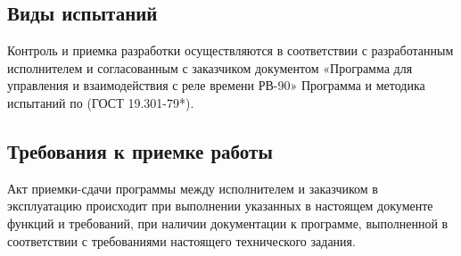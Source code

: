 \subsection{Виды испытаний}
Контроль и приемка разработки осуществляются в соответствии с разработанным исполнителем и согласованным с заказчиком документом «Программа для управления и взаимодействия с реле времени РВ-90» Программа и методика испытаний по (ГОСТ 19.301-79*).

\subsection{Требования к приемке работы}
Акт приемки-сдачи программы между исполнителем и заказчиком в эксплуатацию происходит при выполнении указанных в настоящем документе функций и требований, при наличии документации к программе, выполненной в соответствии с требованиями настоящего технического задания.